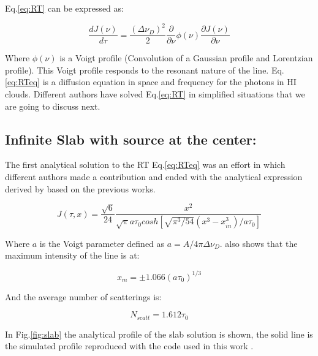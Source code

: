 Eq.\ref{eq:RT} can be expressed as: 

\begin{equation}\label{eq:RTeq}
\dfrac{dJ(\nu)}{d\tau} = \dfrac{(\Delta \nu_D)^2}{2}\dfrac{\partial}{\partial \nu}\phi(\nu)\dfrac{\partial J(\nu)}{\partial \nu}
\end{equation}

Where $\phi(\nu)$ is a Voigt profile (Convolution of a Gaussian profile  
and Lorentzian profile). This Voigt profile responds to the resonant nature 
of the line. Eq.\ref{eq:RTeq} is a diffusion equation in space and frequency
for the \ly photons in HI clouds. Different authors have solved 
Eq.\ref{eq:RT} in simplified situations that we are going to discuss next. 

\subsection{Infinite Slab with \ly source at the center:}

The first analytical solution to the RT Eq.\ref{eq:RTeq}
was an effort in which different authors made a contribution \citep{Unno55, Osterbrock62, Adams72, Harrington73} and ended with the analytical expression
derived by \citep{Neufeld90} based on the previous works. 

\begin{equation}
J(\tau, x) = \dfrac{\sqrt{6}}{24}\dfrac{x^2}{\sqrt{\pi}a\tau_0 cosh[\sqrt{\pi^3/54}(x^3-x_{in}^3)/a\tau_0]}
\end{equation}

Where $a$ is the Voigt parameter defined as $a=A/4\pi\Delta \nu_D$. \citep{Harrington73} also shows that the maximum intensity of the line is at:

\begin{equation}
x_m = \pm1.066(a\tau_0)^{1/3}
\end{equation}

And the average number of scatterings is:

\begin{equation}
N_{scatt} = 1.612\tau_0
\end{equation}

In Fig.\ref{fig:slab} the analytical profile of the slab solution is shown, 
the solid line is the simulated profile reproduced with the code
used in this work \citep{CLARA}.

